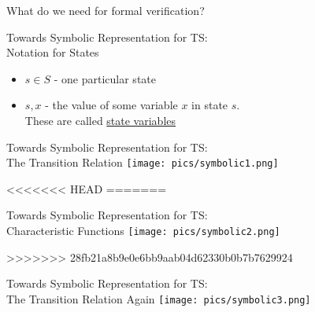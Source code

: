 \documentclass{beamer}
\begin{document}
\begin{frame}{What do we need for formal verification?}
\begin{frame}{Towards Symbolic Representation for TS:\\
Notation for States}
\begin{itemize}
\item $s \in S$ - one particular state

\item $s,x$ - the value of some variable $x$ in state $s$. \\
These are called \underline{state variables}
\end{itemize}
\end{frame}

\begin{frame}{Towards Symbolic Representation for TS:\\The Transition Relation}
\texttt{[image: pics/symbolic1.png]}
\end{frame}

<<<<<<< HEAD
=======
\begin{frame}{Towards Symbolic Representation for TS:\\Characteristic Functions}
\texttt{[image: pics/symbolic2.png]}
\end{frame}

>>>>>>> 28fb21a8b9e0e6bb9aab04d62330b0b7b7629924
\begin{frame}{Towards Symbolic Representation for TS:\\The Transition Relation Again}
\texttt{[image: pics/symbolic3.png]}
\end{frame}


\end{frame}
\end{document}
